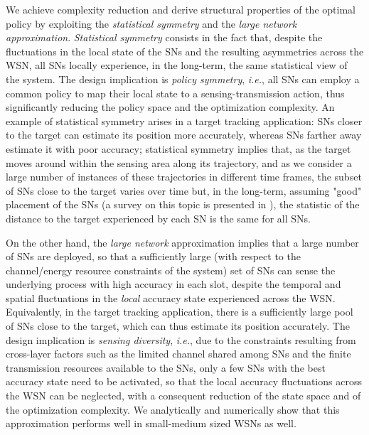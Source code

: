 \documentclass[10pt,twocolumn,twoside]{IEEEtran}
\theoremstyle{plain}
\begin{document}
We achieve complexity reduction and derive structural properties of the optimal policy by exploiting the \emph{statistical symmetry}
   and the \emph{large network approximation}. \emph{Statistical symmetry} consists in the fact that,
  despite the fluctuations in the local state of the SNs and the resulting asymmetries across the WSN,
all SNs locally experience, in the long-term, the same statistical view of the system.   
  The design implication is \emph{policy symmetry}, \emph{i.e.}, all SNs can employ a common policy to map
 their local state to a sensing-transmission action, thus significantly reducing the policy space and the optimization complexity.
 An example of statistical symmetry arises in a target tracking application: SNs closer to the target can estimate its position more accurately, whereas SNs farther away estimate it with poor accuracy; statistical symmetry implies that,
  as the target moves around within the sensing area along its trajectory, and as we consider a large number of instances of these trajectories
  in different time frames, the subset of SNs close to the target varies over time but, in the long-term, 
assuming "good" placement of the SNs (a survey on this topic is presented in \cite{Younis}),
   the statistic of the distance to the target experienced by each SN is the same for all SNs.
   
 On the other hand, the \emph{large network} approximation implies that
a large number of SNs are deployed, so that a sufficiently large (with respect to the channel/energy resource constraints of the system) set of SNs
can sense the underlying process with high accuracy in each slot, despite the temporal and spatial fluctuations in the \emph{local} accuracy state experienced across the WSN. Equivalently, in the target tracking application, there is a sufficiently large pool of SNs close to the target, which can thus estimate its position accurately.
The design implication is \emph{sensing diversity}, \emph{i.e.}, 
due to the constraints resulting from cross-layer factors such as the limited channel shared among SNs and the finite transmission resources available to the SNs,
only a few SNs with the best accuracy state need to be activated, so that the local accuracy fluctuations across the WSN can be neglected, with a consequent reduction of the state space and of the optimization complexity.
We analytically and numerically show that this approximation performs well in small-medium sized WSNs as well.
\end{document}
